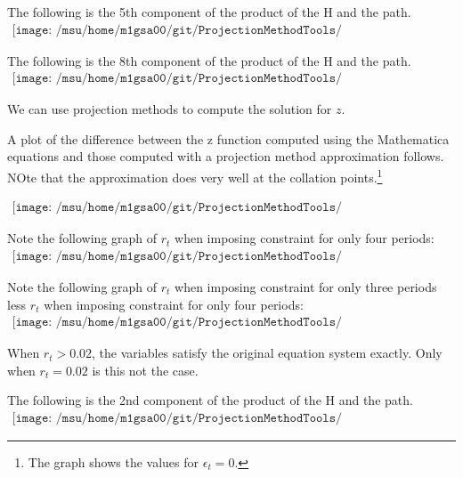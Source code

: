 \documentclass[12pt]{article}
\begin{document}
The following is the 5th component of the product of the H and the path.
\begin{gather*}
\texttt{[image: /msu/home/m1gsa00/git/ProjectionMethodTools/ProjectionMethodToolsJava/code/prettyhapp03B.pdf]}
\end{gather*}

The following is the 8th component of the product of the H and the path.
\begin{gather*}
\texttt{[image: /msu/home/m1gsa00/git/ProjectionMethodTools/ProjectionMethodToolsJava/code/prettyhapp03C.pdf]}
\end{gather*}



We can use projection methods to compute the solution for $z$.

A plot of the difference between the z function computed using the Mathematica equations and those computed with a projection method approximation follows. NOte that the approximation does very well at the collation points.\footnote{The graph shows the values for $\epsilon_t=0$.}


\begin{gather*}
\texttt{[image: /msu/home/m1gsa00/git/ProjectionMethodTools/ProjectionMethodToolsJava/code/prettyNumDiff03.pdf]}
\end{gather*}




Note the following graph of $r_t$ when imposing constraint for only four
 periods:
\begin{gather*}
\texttt{[image: /msu/home/m1gsa00/git/ProjectionMethodTools/ProjectionMethodToolsJava/code/prettyrr04.pdf]}
\end{gather*}



Note the following graph of $r_t$ when imposing constraint for only three periods
less $r_t$ when imposing constraint for only four periods:
\begin{gather*}
\texttt{[image: /msu/home/m1gsa00/git/ProjectionMethodTools/ProjectionMethodToolsJava/code/prettyrr03lessrr04.pdf]}
\end{gather*}


When $r_t>0.02$, the variables satisfy the original equation system exactly.
Only when $r_t=0.02$ is this not the case.


The following is the 2nd component of the product of the H and the path.
\begin{gather*}
\texttt{[image: /msu/home/m1gsa00/git/ProjectionMethodTools/ProjectionMethodToolsJava/code/prettyhapp04A.pdf]}
\end{gather*}
\end{document}
